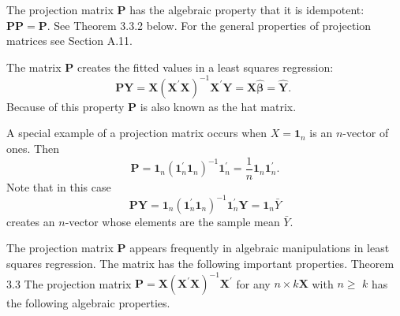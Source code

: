 \documentclass[10pt]{article}
\begin{document}
The projection matrix $\boldsymbol{P}$ has the algebraic property that it is idempotent: $\boldsymbol{P} \boldsymbol{P}=\boldsymbol{P}$. See Theorem 3.3.2 below. For the general properties of projection matrices see Section A.11.

The matrix $\boldsymbol{P}$ creates the fitted values in a least squares regression:
$$
\boldsymbol{P} \boldsymbol{Y}=\boldsymbol{X}\left(\boldsymbol{X}^{\prime} \boldsymbol{X}\right)^{-1} \boldsymbol{X}^{\prime} \boldsymbol{Y}=\boldsymbol{X} \widehat{\boldsymbol{\beta}}=\widehat{\boldsymbol{Y}} \text {. }
$$
Because of this property $\boldsymbol{P}$ is also known as the hat matrix.

A special example of a projection matrix occurs when $X=\mathbf{1}_{n}$ is an $n$-vector of ones. Then
$$
\boldsymbol{P}=\mathbf{1}_{n}\left(\mathbf{1}_{n}^{\prime} \mathbf{1}_{n}\right)^{-1} \mathbf{1}_{n}^{\prime}=\frac{1}{n} \mathbf{1}_{n} \mathbf{1}_{n}^{\prime} .
$$
Note that in this case
$$
\boldsymbol{P} \boldsymbol{Y}=\mathbf{1}_{n}\left(\mathbf{1}_{n}^{\prime} \mathbf{1}_{n}\right)^{-1} \mathbf{1}_{n}^{\prime} \boldsymbol{Y}=\mathbf{1}_{n} \bar{Y}
$$
creates an $n$-vector whose elements are the sample mean $\bar{Y}$.

The projection matrix $\boldsymbol{P}$ appears frequently in algebraic manipulations in least squares regression. The matrix has the following important properties. Theorem 3.3 The projection matrix $\boldsymbol{P}=\boldsymbol{X}\left(\boldsymbol{X}^{\prime} \boldsymbol{X}\right)^{-1} \boldsymbol{X}^{\prime}$ for any $n \times k \boldsymbol{X}$ with $n \geq$ $k$ has the following algebraic properties.
\end{document}
